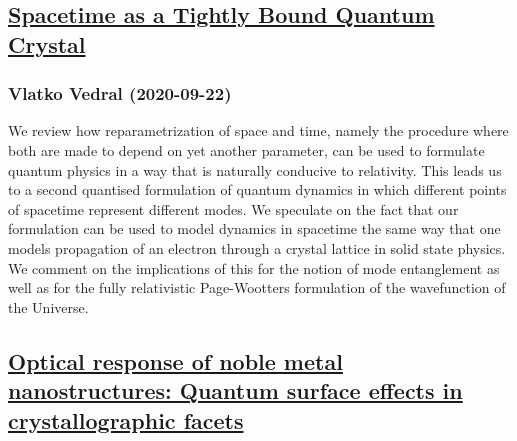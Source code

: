 {\subsection*{\href{http://arxiv.org/abs/2009.10836v1}{Spacetime as a Tightly Bound Quantum Crystal}}
\subsubsection*{Vlatko Vedral (2020-09-22)}
We review how reparametrization of space and time, namely the procedure where
both are made to depend on yet another parameter, can be used to formulate
quantum physics in a way that is naturally conducive to relativity. This leads
us to a second quantised formulation of quantum dynamics in which different
points of spacetime represent different modes. We speculate on the fact that
our formulation can be used to model dynamics in spacetime the same way that
one models propagation of an electron through a crystal lattice in solid state
physics. We comment on the implications of this for the notion of mode
entanglement as well as for the fully relativistic Page-Wootters formulation of
the wavefunction of the Universe.

\subsection*{\href{http://arxiv.org/abs/2009.10821v1}{Optical response of noble metal nanostructures: Quantum surface effects  in crystallographic facets}}
}
